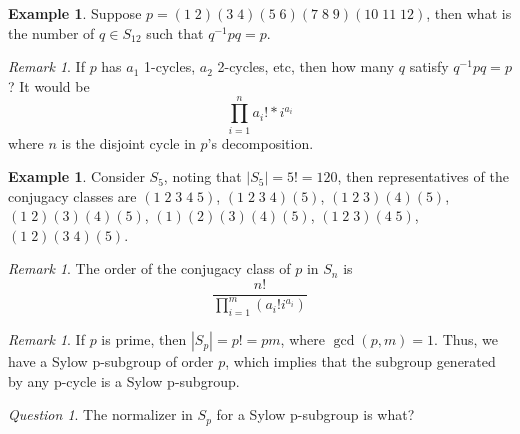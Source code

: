 \documentclass[12pt]{article}
\theoremstyle{definition}
\newtheorem{eg}[thm]{Example}
\theoremstyle{remark}
\newtheorem{rmk}[thm]{Remark}
\newtheorem*{qst}{Question}
\numberwithin{equation}{section}
\begin{document}
\vspace{15pt}


\begin{eg}
        Suppose $p = (1\;2)(3\;4)(5\;6)(7\;8\;9)(10\;11\;12)$, then what is the number of $q \in S_{12}$ such that $q^{-1}pq = p$.
\end{eg}


\vspace{15pt}


\begin{rmk} 
        If $p$ has $a_1$ 1-cycles, $a_2$ 2-cycles, etc, then how many $q$ satisfy $q^{-1}pq = p$? It would be \begin{equation}
                \prod\limits_{i=1}^na_i!*i^{a_i}
        \end{equation}
        where $n$ is the disjoint cycle in $p$'s decomposition.
\end{rmk}

\vspace{15pt}

\begin{eg}
        Consider $S_5$, noting that $|S_5| = 5! = 120$, then representatives of the conjugacy classes are $(1\;2\;3\;4\;5)$, $(1\;2\;3\;4)(5)$, $(1\;2\;3)(4)(5)$, $(1\;2)(3)(4)(5)$, $(1)(2)(3)(4)(5)$, $(1\;2\;3)(4\;5)$, $(1\;2)(3\;4)(5)$.
\end{eg}


\vspace{15pt}


\begin{rmk}
        The order of the conjugacy class of $p$ in $S_n$ is \begin{equation}
                \frac{n!}{\prod\limits_{i=1}^m(a_i!i^{a_i})}
        \end{equation}
\end{rmk}

\vspace{15pt}

\begin{rmk}
        If $p$ is prime, then $|S_p| = p! = pm$, where $\gcd(p,m) = 1$. Thus, we have a Sylow p-subgroup of order $p$, which implies that the subgroup generated by any p-cycle is a Sylow p-subgroup.
\end{rmk}

\vspace{15pt}

\begin{qst}
        The normalizer in $S_p$ for a Sylow p-subgroup is what?
\end{qst}
\end{document}
